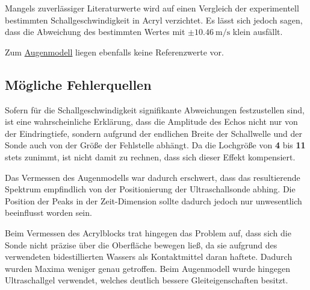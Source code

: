 Mangels zuverlässiger Literaturwerte wird auf einen Vergleich der experimentell bestimmten Schallgeschwindigkeit in Acryl verzichtet.
Es lässt sich jedoch sagen,
dass die Abweichung des bestimmten Wertes mit $\pm \SI{10.46}{\meter\per\second}$ klein ausfällt.

Zum \hyperref[sec:auswertung:augenmodell]{Augenmodell} liegen ebenfalls keine Referenzwerte vor.

\subsection{Mögliche Fehlerquellen}



Sofern für die Schallgeschwindigkeit signifikante Abweichungen festzustellen sind,
ist eine wahrscheinliche Erklärung,
dass die Amplitude des Echos nicht nur von der Eindringtiefe,
sondern aufgrund der endlichen Breite der Schallwelle und der Sonde
auch von der Größe der Fehlstelle abhängt.
Da die Lochgröße von \textbf{4} bis \textbf{11} stets zunimmt,
ist nicht damit zu rechnen, dass sich dieser Effekt kompensiert.

Das Vermessen des Augenmodells war dadurch erschwert,
dass das resultierende Spektrum empfindlich von der Positionierung der Ultraschallsonde abhing.
Die Position der Peaks in der Zeit-Dimension sollte dadurch jedoch nur unwesentlich beeinflusst worden sein.

Beim Vermessen des Acrylblocks trat hingegen das Problem auf,
dass sich die Sonde nicht präzise über die Oberfläche bewegen ließ,
da sie aufgrund des verwendeten bidestillierten Wassers als Kontaktmittel
daran haftete.
Dadurch wurden Maxima weniger genau getroffen.
Beim Augenmodell wurde hingegen Ultraschallgel verwendet,
welches deutlich bessere Gleiteigenschaften besitzt.

